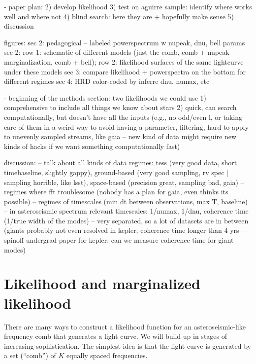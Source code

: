 \documentclass[modern]{aastex63}
\begin{document}
- paper plan:
2) develop likelihood
3) test on aguirre sample: identify where works well and where not
4) blind search: here they are + hopefully make sense
5) discussion


figures:
sec 2: pedagogical -- labeled powerspectrum w nupeak, dnu, bell params 
sec 2: row 1: schematic of different models (just the comb, comb + nupeak marginalization, comb + bell); row 2: likelihood surfaces of the same lightcurve under these models
sec 3: compare likelihood + powerspectra on the bottom for different regimes
sec 4: HRD color-coded by inferre dnu, numax, etc


- beginning of the methods section: two likelihoods we could use
1) comprehensive to include all things we know about stars
2) quick, can search computationally, but doesn't have all the inputs (e.g., no odd/even l, or taking care of them in a weird way to avoid having a parameter, filtering, hard to apply to unevenly sampled streams, like gaia -- new kind of data might require new kinds of hacks if we want something computationally fast)


discussion:
-- talk about all kinds of data regimes: tess (very good data, short timebaseline, slightly gappy), ground-based (very good sampling, rv spec | sampling horrible, like lsst), space-based (precision great, sampling bad, gaia) -- regimes where fft troublesome (nobody has a plan for gaia, even thinks its possible)
-- regimes of timescales (min dt between observations, max T, baseline)
-- in asteroseismic spectrum relevant timescales: 1/numax, 1/dnu, coherence time (1/true width of the modes) -- very separated, so a lot of datasets are in between (giants probably not even resolved in kepler, coherence time longer than 4 yrs -- spinoff undergrad paper for kepler: can we measure coherence time for giant modes)


\section{Likelihood and marginalized likelihood}
\label{sec:lhood}

There are many ways to construct a likelihood function for an
asteroseismic-like frequency comb that generates a light curve.
We will build up in stages of increasing sophistication.
The simplest idea is that the light curve is generated by a set (``comb'') of
$K$ equally spaced frequencies.
\end{document}
